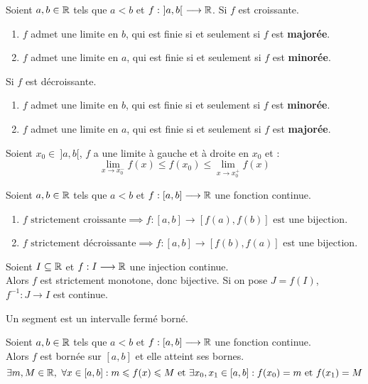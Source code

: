 \begin{theorem}
	Soient $a, b \in \mathbb{R}$ tels que $a < b$ et $f :\ ]a, b[ \ \longrightarrow \mathbb{R}$. 
	Si $f$ est croissante.
	\begin{enumerate}
		\item $f$ admet une limite en $b$, qui est finie si et seulement si $f$ est \textbf{majorée}.
		\item $f$ admet une limite en $a$, qui est finie si et seulement si $f$ est \textbf{minorée}.
	\end{enumerate}
	Si $f$ est décroissante.
	\begin{enumerate}
		\item $f$ admet une limite en $b$, qui est finie si et seulement si $f$ est \textbf{minorée}.
		\item $f$ admet une limite en $a$, qui est finie si et seulement si $f$ est \textbf{majorée}.
	\end{enumerate}
	Soient $x_0 \in \ ]a, b[$, $f$ a une limite à gauche et à droite en $x_0$ et :
	\[ \lim_{x \to x_0^-} f(x) \leq f(x_0) \leq \lim_{x \to x_0^+} f(x) \]
\end{theorem}

\begin{theorem}
	Soient $a, b \in \mathbb{R}$ tels que $a < b$ et $f : [a, b] \longrightarrow \mathbb{R}$ une fonction continue.
	\begin{enumerate}
	    \item $ f \text{ strictement croissante} \implies f : [a, b] \longrightarrow [f(a), f(b)] \text{ est une bijection} $.
            \item $ f \text{ strictement décroissante} \implies f : [a, b] \longrightarrow [f(b), f(a)] \text{ est une bijection} $.
	\end{enumerate}
\end{theorem}

\begin{theorem}
	Soient $I \subseteq \mathbb{R}$ et $f : I \longrightarrow \mathbb{R}$ une injection continue.
	\\
	Alors $f$ est strictement monotone, donc bijective. Si on pose $J = f(I)$, $f^{-1} : J \to I$ est continue.
\end{theorem}

\begin{definition}[Segment]
	Un segment est un intervalle fermé borné.
\end{definition}

\begin{theorem}
	Soient $a, b \in \mathbb{R}$ tels que $a < b$ et $f : [a, b] \longrightarrow \mathbb{R}$ une fonction continue.
	\\
	Alors $f$ est bornée sur $[a, b]$ et elle atteint ses bornes.
	\[ \exists m, M \in \mathbb{R},\ \forall x \in [a, b] : m \leqslant f(x) \leqslant M \text{ et } \exists x_0, x_1 \in [a, b] : f(x_0) = m \text{ et } f(x_1) = M \]
\end{theorem}

